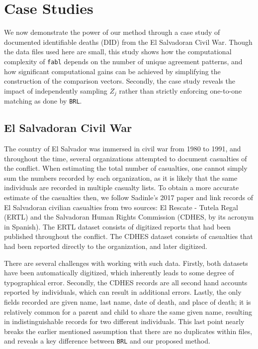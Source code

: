 \documentclass[12pt,letterpaper]{article}
\newcommand{\1}[1]{\mathbb{I}\!\left[#1\right]} %
\begin{document}
 

\section{Case Studies}
\label{sex:case-studies}

We now demonstrate the power of our method through a case study of documented identifiable deaths (DID) from the El Salvadoran Civil War. Though the data files used here are small, this study shows how the computational complexity of \texttt{fabl} depends on the number of unique agreement patterns, and how significant computational gains can be achieved by simplifying the construction of the comparison vectors. Secondly, the case study reveals the impact of independently sampling $Z_j$ rather than strictly enforcing one-to-one matching as done by \texttt{BRL}. 


\subsection{El Salvadoran Civil War}
\label{el_salvador}

The country of El Salvador was immersed in civil war from 1980 to 1991,
and throughout the time, several organizations attempted to document
casualties of the conflict. When estimating the total number of
casualties, one cannot simply sum the numbers recorded by each
organization, as it is likely that the same individuals are recorded in
multiple casualty lists. To obtain a more accurate estimate of the
casualties then, we follow Sadinle's 2017 paper and link records of El
Salvadoran civilian casualties from two sources: El Rescate - Tutela
Regal (ERTL) and the Salvadoran Human Rights Commission (CDHES, by its
acronym in Spanish). The ERTL dataset consists of digitized reports that
had been published throughout the conflict. The CDHES dataset consists
of casualties that had been reported directly to the organization, and
later digitized.

There are several challenges with working with such data. Firstly, both
datasets have been automatically digitized, which inherently leads to
some degree of typographical error. Secondly, the CDHES records are all
second hand accounts reported by individuals, which can result in
additional errors. Lastly, the only fields recorded are given name, last
name, date of death, and place of death; it is relatively common for a
parent and child to share the same given name, resulting in
indistinguishable records for two different individuals. This last point
nearly breaks the earlier mentioned assumption that there are no
duplicates within files, and reveals a key difference between
\texttt{BRL} and our proposed method.
\end{document}

